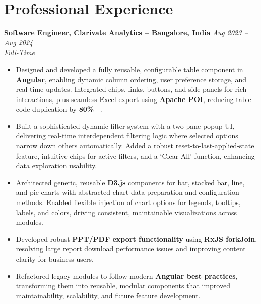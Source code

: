 \documentclass[10pt, letterpaper]{article}
\newenvironment{highlights}{\begin{itemize}[topsep=0.10 cm, parsep=0.10 cm, partopsep=0pt, itemsep=2pt, leftmargin=10pt]}{\end{itemize}}
\begin{document}
\newcommand{\experienceentry}[4]{%
  \noindent\textbf{#1} \hfill \textit{#2}\\
  \textit{#3} \\
  #4
}

\section{Professional Experience}

\experienceentry
  {Software Engineer, Clarivate Analytics -- Bangalore, India}
  {Aug 2023 -- Aug 2024}
  {Full-Time}
  {
    \begin{highlights}
        \item Designed and developed a fully reusable, configurable table component in \textbf{Angular}, enabling dynamic column ordering, user preference storage, and real-time updates. Integrated chips, links, buttons, and side panels for rich interactions, plus seamless Excel export using \textbf{Apache POI}, reducing table code duplication by \textbf{80\%+}.

        \item Built a sophisticated dynamic filter system with a two-pane popup UI, delivering real-time interdependent filtering logic where selected options narrow down others automatically. Added a robust reset-to-last-applied-state feature, intuitive chips for active filters, and a ‘Clear All’ function, enhancing data exploration usability.
        
        \item Architected generic, reusable \textbf{D3.js} components for bar, stacked bar, line, and pie charts with abstracted chart data preparation and configuration methods. Enabled flexible injection of chart options for legends, tooltips, labels, and colors, driving consistent, maintainable visualizations across modules.
        
        
        \item Developed robust \textbf{PPT/PDF export functionality} using \textbf{RxJS forkJoin}, resolving large report download performance issues and improving content clarity for business users.
        
        \item Refactored legacy modules to follow modern \textbf{Angular best practices}, transforming them into reusable, modular components that improved maintainability, scalability, and future feature development.


\end{highlights}}
\end{document}
